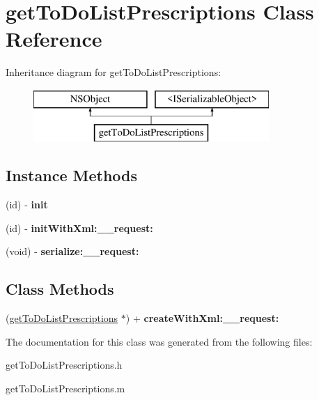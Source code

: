 \hypertarget{interfaceget_to_do_list_prescriptions}{}\section{get\+To\+Do\+List\+Prescriptions Class Reference}
\label{interfaceget_to_do_list_prescriptions}
Inheritance diagram for get\+To\+Do\+List\+Prescriptions\+:\begin{figure}[H]
\begin{center}
\leavevmode
\includegraphics[height=2.000000cm]{interfaceget_to_do_list_prescriptions}
\end{center}
\end{figure}
\subsection*{Instance Methods}
\begin{DoxyCompactItemize}
\item 
\hypertarget{interfaceget_to_do_list_prescriptions_a076d699d4f0ecf2f505276b456443b45}{}(id) -\/ {\bfseries init}\label{interfaceget_to_do_list_prescriptions_a076d699d4f0ecf2f505276b456443b45}

\item 
\hypertarget{interfaceget_to_do_list_prescriptions_ae4643fc927ea1d6eba71af7ac88a96b3}{}(id) -\/ {\bfseries init\+With\+Xml\+:\+\_\+\+\_\+request\+:}\label{interfaceget_to_do_list_prescriptions_ae4643fc927ea1d6eba71af7ac88a96b3}

\item 
\hypertarget{interfaceget_to_do_list_prescriptions_a4f57de672a02d01aa72c8cc7999b04c1}{}(void) -\/ {\bfseries serialize\+:\+\_\+\+\_\+request\+:}\label{interfaceget_to_do_list_prescriptions_a4f57de672a02d01aa72c8cc7999b04c1}

\end{DoxyCompactItemize}
\subsection*{Class Methods}
\begin{DoxyCompactItemize}
\item 
\hypertarget{interfaceget_to_do_list_prescriptions_aaebb0ab114fb0083a861124ddc719387}{}(\hyperlink{interfaceget_to_do_list_prescriptions}{get\+To\+Do\+List\+Prescriptions} $\ast$) + {\bfseries create\+With\+Xml\+:\+\_\+\+\_\+request\+:}\label{interfaceget_to_do_list_prescriptions_aaebb0ab114fb0083a861124ddc719387}

\end{DoxyCompactItemize}


The documentation for this class was generated from the following files\+:\begin{DoxyCompactItemize}
\item 
get\+To\+Do\+List\+Prescriptions.\+h\item 
get\+To\+Do\+List\+Prescriptions.\+m\end{DoxyCompactItemize}
